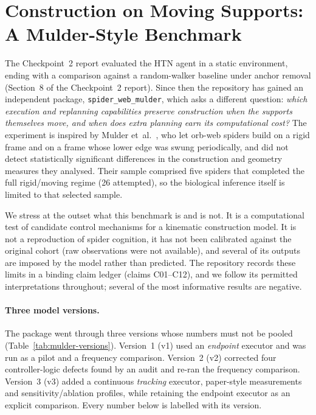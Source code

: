 \section{Construction on Moving Supports: A Mulder-Style Benchmark}
\label{sec:mulder}

The Checkpoint~2 report evaluated the HTN agent in a static environment, ending with a comparison
against a random-walker baseline under anchor removal (Section~8 of the Checkpoint~2 report). Since
then the repository has gained an independent package, \texttt{spider\_\allowbreak{}web\_\allowbreak{}mulder}, which asks a
different question: \emph{which execution and replanning capabilities preserve construction when the
supports themselves move, and when does extra planning earn its computational cost?} The experiment is
inspired by Mulder et~al.\ \cite{mulder2021dynamic}, who let orb-web spiders build on a rigid frame and
on a frame whose lower edge was swung periodically, and did not detect statistically significant
differences in the construction and geometry measures they analysed. Their sample comprised five
spiders that completed the full rigid/moving regime (26 attempted), so the biological inference itself
is limited to that selected sample.

We stress at the outset what this benchmark is and is not. It is a computational test of candidate
control mechanisms for a kinematic construction model. It is not a reproduction of spider cognition,
it has not been calibrated against the original cohort (raw observations were not available), and
several of its outputs are imposed by the model rather than predicted. The repository records these
limits in a binding claim ledger (claims C01--C12), and we follow its permitted interpretations
throughout; several of the most informative results are negative.

\paragraph{Three model versions.} The package went through three versions whose numbers must not be
pooled (Table~\ref{tab:mulder-versions}). Version~1 (v1) used an \emph{endpoint} executor and was run
as a pilot and a frequency comparison. Version~2 (v2) corrected four controller-logic defects found by an
audit and re-ran the frequency comparison. Version~3 (v3) added a continuous \emph{tracking} executor,
paper-style measurements and sensitivity/ablation profiles, while retaining the endpoint executor as an
explicit comparison. Every number below is labelled with its version.

